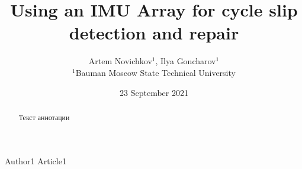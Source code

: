 \documentclass{article}      %
\title{Using an IMU Array for cycle slip detection and repair}  %
\author{Artem Novichkov$^{1}$, Ilya Goncharov$^{1}$ \\
	\small $^{1}$Bauman Moscow State Technical University
}  %
\date{23 September 2021}     %
\begin{document}
\maketitle                   %

\tableofcontents

\begin{abstract}
	Текст аннотации
\end{abstract}











\begin{thebibliography}{00}
	 Author1 Article1
\end{thebibliography}
\end{document}
